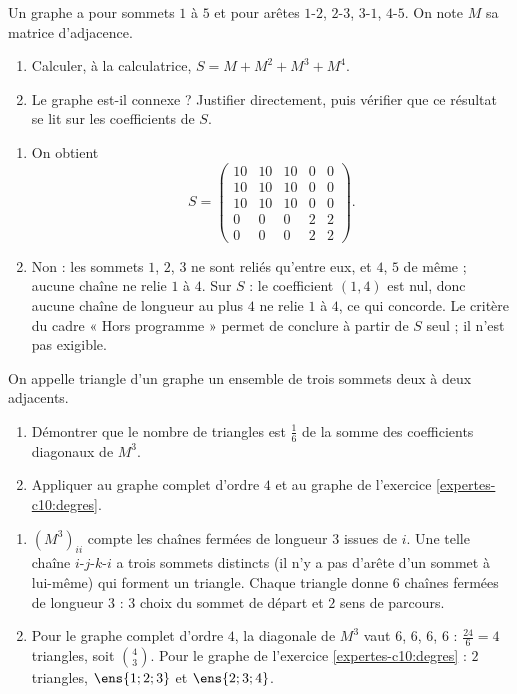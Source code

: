\begin{exercise}
Un graphe a pour sommets $1$ à $5$ et pour arêtes $1$-$2$, $2$-$3$, $3$-$1$, $4$-$5$. On note $M$ sa matrice d'adjacence.
\begin{enumerate}
\item Calculer, à la calculatrice, $S=M+M^2+M^3+M^4$.
\item Le graphe est-il connexe ? Justifier directement, puis vérifier que ce résultat se lit sur les coefficients de $S$.
\end{enumerate}
\end{exercise}
\begin{solution}
\begin{enumerate}
\item On obtient \[S=\begin{pmatrix}10&10&10&0&0\\10&10&10&0&0\\10&10&10&0&0\\0&0&0&2&2\\0&0&0&2&2\end{pmatrix}.\]
\item Non : les sommets $1$, $2$, $3$ ne sont reliés qu'entre eux, et $4$, $5$ de même ; aucune chaîne ne relie $1$ à $4$. Sur $S$ : le coefficient $(1,4)$ est nul, donc aucune chaîne de longueur au plus $4$ ne relie $1$ à $4$, ce qui concorde. Le critère du cadre « Hors programme » permet de conclure à partir de $S$ seul ; il n'est pas exigible.
\end{enumerate}
\end{solution}

\begin{exercise}
On appelle triangle d'un graphe un ensemble de trois sommets deux à deux adjacents.
\begin{enumerate}
\item Démontrer que le nombre de triangles est $\frac16$ de la somme des coefficients diagonaux de $M^3$.
\item Appliquer au graphe complet d'ordre $4$ et au graphe de l'exercice \ref{expertes-c10:degres}.
\end{enumerate}
\end{exercise}
\begin{solution}
\begin{enumerate}
\item $\left(M^3\right)_{ii}$ compte les chaînes fermées de longueur $3$ issues de $i$. Une telle chaîne $i$-$j$-$k$-$i$ a trois sommets distincts (il n'y a pas d'arête d'un sommet à lui-même) qui forment un triangle. Chaque triangle donne $6$ chaînes fermées de longueur $3$ : $3$ choix du sommet de départ et $2$ sens de parcours.
\item Pour le graphe complet d'ordre $4$, la diagonale de $M^3$ vaut $6$, $6$, $6$, $6$ : $\frac{24}6=4$ triangles, soit $\binom43$. Pour le graphe de l'exercice \ref{expertes-c10:degres} : $2$ triangles, $\ens{1;2;3}$ et $\ens{2;3;4}$.
\end{enumerate}
\end{solution}

